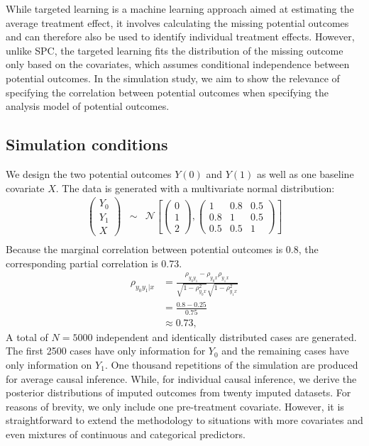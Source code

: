 	While targeted learning is a machine learning approach aimed at estimating the average treatment effect, it involves calculating the missing potential outcomes and can therefore also be used to identify individual treatment effects. However, unlike SPC, the targeted learning fits the distribution of the missing outcome only based on the covariates, which assumes conditional independence between potential outcomes. In the simulation study, we aim to show the relevance of specifying the correlation between potential outcomes when specifying the analysis model of potential outcomes.              
	\subsection{Simulation conditions}
	\label{sec:4.5.1}
	We design the two potential outcomes $Y(0)$ and $Y(1)$ as well as one baseline covariate $X$. The data is generated with a multivariate normal distribution:
	\begin{eqnarray*}
		\begin{pmatrix}Y_{0}\\
			Y_{1}\\
			X
		\end{pmatrix} & \sim & \mathcal{N}\left[\left(\begin{array}{c}
			0\\
			1\\
			2
		\end{array}\right),\left(\begin{array}{ccc}
			1 & 0.8 & 0.5\\
			0.8 & 1 & 0.5\\
			0.5 & 0.5 & 1
		\end{array}\right)\right]\\
	\end{eqnarray*}
	Because the marginal correlation between potential outcomes is 0.8, the corresponding partial correlation is 0.73. 
	\begin{equation}
		\begin{array}{cl}
			\rho_{y_{0}y_{1}|x} &= \frac{\rho_{y_{0}y_{1}} - \rho_{y_{0}x}\rho_{y_{1}x}}{\sqrt{1 - \rho_{y_{0}x}^2}\sqrt{1 - \rho_{y_{1}x}^2}} \\
			&= \frac{0.8 - 0.25}{0.75}\\
			&\approx 0.73,
		\end{array}
	\end{equation}
	A total of $N = 5000$ independent and identically distributed cases are generated. The first 2500 cases have only information for $Y_0$ and the remaining cases have only information on $Y_1$. One thousand repetitions of the simulation are produced for average causal inference. While, for individual causal inference, we derive the posterior distributions of imputed outcomes from twenty imputed datasets. For reasons of brevity, we only include one pre-treatment covariate. However, it is straightforward to extend the methodology to situations with more covariates and even mixtures of continuous and categorical predictors.
	    
